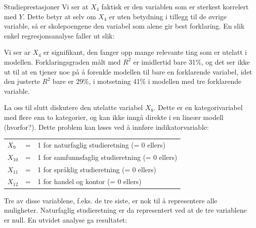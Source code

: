\begin{eksempel}{Studieprestasjoner}
\noindent Vi ser at $X_4$ faktisk er den variablen som er sterkest korrelert
 med $Y$. Dette betyr at selv om $X_4$ er uten betydning i tillegg til de
 øvrige variable, så er skolepoengene den variabel som alene gir best
 forklaring. En slik enkel regresjonsanalyse faller ut slik:

\begin{center}  \end{center}

\noindent Vi ser ar $X_4$ er signifikant, den fanger opp mange relevante ting som er
utelatt i modellen.  Forklaringsgraden målt med $R^2$ er imidlertid bare
31\%, og det ser ikke ut til at en tjener noe på å forenkle modellen
til bare en forklarende variabel, idet den justerte $R^2$ bare er 29\%, i
motsetning 41\% i modellen med tre forklarende variable.

La oss til slutt diskutere den utelatte variabel $X_8$.  Dette er en
kategorivariabel med flere enn to kategorier, og kan ikke inngå direkte
i en lineær modell (hvorfor?).  Dette problem kan løses ved å
innføre indikatorvariable:

\begin{center}
\begin{tabular}{lcl}
$X_9$    &=& 1 for naturfaglig studieretning  (= 0 ellers) \\
$X_{10}$ &=& 1 for samfunnsfaglig studieretning (= 0 ellers) \\
$X_{11}$ &=& 1 for språklig studieretning (= 0 ellers) \\
$X_{12}$ &=& 1 for handel og kontor (= 0 ellers)
\end{tabular}
\end{center}
Tre av disse variablene, f.eks. de tre siste, er nok til å representere
alle muligheter.  Naturfaglig studieretning er da representert ved at de
tre va\-ria\-blene er null.  En utvidet analyse ga resultatet:


\end{eksempel}
